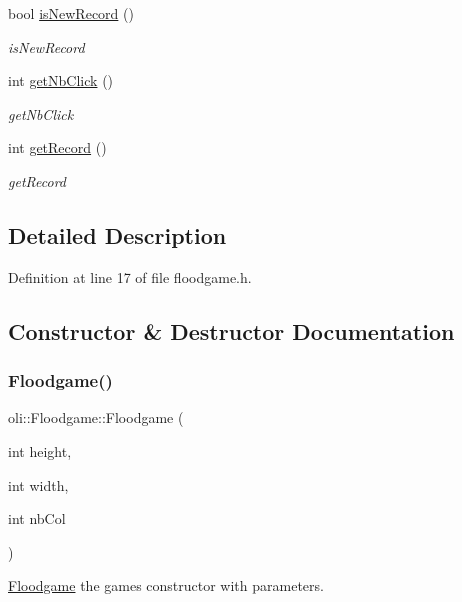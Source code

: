 \begin{DoxyCompactItemize}
bool \hyperlink{classoli_1_1_floodgame_a35b5e1c7f39c73d7d46b8c71156fbfbc}{is\+New\+Record} ()
\begin{DoxyCompactList}\small\item\em is\+New\+Record \end{DoxyCompactList}\item 
int \hyperlink{classoli_1_1_floodgame_aae08dd4e048b1521797c44a68d08f250}{get\+Nb\+Click} ()
\begin{DoxyCompactList}\small\item\em get\+Nb\+Click \end{DoxyCompactList}\item 
int \hyperlink{classoli_1_1_floodgame_af0084c4fecf2b51da6aed1f73de05e9e}{get\+Record} ()
\begin{DoxyCompactList}\small\item\em get\+Record \end{DoxyCompactList}\end{DoxyCompactItemize}


\subsection{Detailed Description}


Definition at line 17 of file floodgame.\+h.



\subsection{Constructor \& Destructor Documentation}
\hypertarget{classoli_1_1_floodgame_ac411db6e80baa3e2a9c41d7ee71fd006}{}\label{classoli_1_1_floodgame_ac411db6e80baa3e2a9c41d7ee71fd006} 
\subsubsection{\texorpdfstring{Floodgame()}{Floodgame()}}
{\footnotesize\ttfamily oli\+::\+Floodgame\+::\+Floodgame (\begin{DoxyParamCaption}\item[{int}]{height,  }\item[{int}]{width,  }\item[{int}]{nb\+Col }\end{DoxyParamCaption})}



\hyperlink{classoli_1_1_floodgame}{Floodgame} the game\textquotesingle{}s constructor with parameters. 


